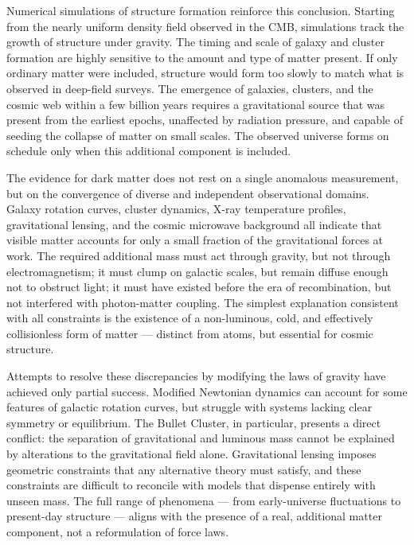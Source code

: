 Numerical simulations of structure formation reinforce this conclusion. Starting from the nearly uniform density field observed in the CMB, simulations track the growth of structure under gravity. The timing and scale of galaxy and cluster formation are highly sensitive to the amount and type of matter present. If only ordinary matter were included, structure would form too slowly to match what is observed in deep-field surveys. The emergence of galaxies, clusters, and the cosmic web within a few billion years requires a gravitational source that was present from the earliest epochs, unaffected by radiation pressure, and capable of seeding the collapse of matter on small scales. The observed universe forms on schedule only when this additional component is included.

The evidence for dark matter does not rest on a single anomalous measurement, but on the convergence of diverse and independent observational domains. Galaxy rotation curves, cluster dynamics, X-ray temperature profiles, gravitational lensing, and the cosmic microwave background all indicate that visible matter accounts for only a small fraction of the gravitational forces at work. The required additional mass must act through gravity, but not through electromagnetism; it must clump on galactic scales, but remain diffuse enough not to obstruct light; it must have existed before the era of recombination, but not interfered with photon-matter coupling. The simplest explanation consistent with all constraints is the existence of a non-luminous, cold, and effectively collisionless form of matter — distinct from atoms, but essential for cosmic structure.

Attempts to resolve these discrepancies by modifying the laws of gravity have achieved only partial success. Modified Newtonian dynamics can account for some features of galactic rotation curves, but struggle with systems lacking clear symmetry or equilibrium. The Bullet Cluster, in particular, presents a direct conflict: the separation of gravitational and luminous mass cannot be explained by alterations to the gravitational field alone. Gravitational lensing imposes geometric constraints that any alternative theory must satisfy, and these constraints are difficult to reconcile with models that dispense entirely with unseen mass. The full range of phenomena — from early-universe fluctuations to present-day structure — aligns with the presence of a real, additional matter component, not a reformulation of force laws.
